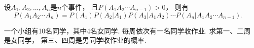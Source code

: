 \begin{corollary}
设\(A_1,A_2,\dotsc,A_n\)是\(n\)个事件，
且\(P(A_1 A_2 \dotsm A_{n-1}) > 0\)，
则有\begin{equation}%
	P(A_1 A_2 \dotsm A_n)
	= P(A_1) P(A_2 \vert A_1) P(A_3 \vert A_1 A_2) \dotsm P(A_n \vert A_1 A_2 \dotsm A_{n-1}).
\end{equation}
\end{corollary}

\begin{example}
一个小组有10名同学，其中4名女同学.
每周依次有一名同学收作业.
求第一、二周是女同学，
第三、四周是男同学收作业的概率.
\end{example}

